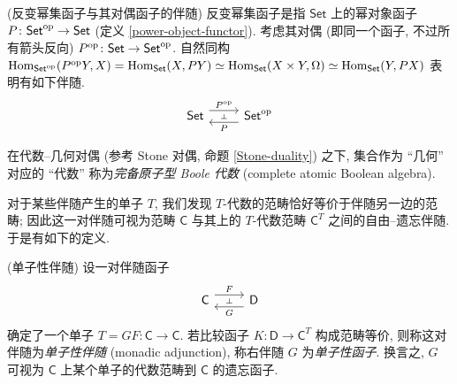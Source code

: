 \begin{example}
	{(反变幂集函子与其对偶函子的伴随)}
	反变幂集函子是指 $\mathsf {Set}$ 上的幂对象函子 $P\colon \mathsf {Set}^{\text{op}} \to \mathsf {Set}$ (定义 \ref{power-object-functor}). 考虑其对偶 (即同一个函子, 不过所有箭头反向) $P^{\text{op}}\colon \mathsf {Set}\to\mathsf {Set}^{\text{op}}$. 自然同构 $\operatorname{Hom}_{\mathsf {Set}^{\text{op}}}(P^{\text{op}} Y,X) = \operatorname{Hom}_{\mathsf {Set}}(X,PY)\simeq \operatorname{Hom}_{\mathsf {Set}}(X\times Y,\Omega) \simeq \operatorname{Hom}_{\mathsf {Set}}(Y,PX)$ 表明有如下伴随.
	\[\begin{tikzcd}[ampersand replacement=\&]
		{\mathsf {Set}} \& {\mathsf {Set}^\op}
		\arrow[""{name=0, anchor=center, inner sep=0}, "{P^\op}", shift left=2, from=1-1, to=1-2]
		\arrow[""{name=1, anchor=center, inner sep=0}, "P", shift left=2, from=1-2, to=1-1]
		\arrow["\dashv"{anchor=center, rotate=-90}, draw=none, from=0, to=1]
	\end{tikzcd}\]
	
	在代数--几何对偶 (参考 Stone 对偶, 命题 \ref{Stone-duality}) 之下, 集合作为 ``几何'' 对应的 ``代数'' 称为\emph{完备原子型 Boole 代数} (complete atomic Boolean algebra).
\end{example}

对于某些伴随产生的单子 $T$, 我们发现 $T$-代数的范畴恰好等价于伴随另一边的范畴; 因此这一对伴随可视为范畴 $\mathsf C$ 与其上的 $T$-代数范畴 $\mathsf C^T$ 之间的自由--遗忘伴随. 于是有如下的定义.

\begin{definition}
    {(单子性伴随)}
    设一对伴随函子
    $$
    \begin{tikzcd}[ampersand replacement=\&]
    	{\mathsf C} \& {\mathsf D}
    	\arrow[""{name=0, anchor=center, inner sep=0}, "G", shift left=2, from=1-2, to=1-1]
    	\arrow[""{name=1, anchor=center, inner sep=0}, "F", shift left=2, from=1-1, to=1-2]
    	\arrow["\dashv"{anchor=center, rotate=-90}, draw=none, from=1, to=0]
    \end{tikzcd}
    $$
    确定了一个单子 $T = GF \colon \mathsf C \to \mathsf C$.
    若比较函子 $K\colon \mathsf D\to\mathsf C^T$ 构成范畴等价, 则称这对伴随为\emph{单子性伴随} (monadic adjunction), 称右伴随 $G$ 为\emph{单子性函子}. 换言之, $G$ 可视为 $\mathsf C$ 上某个单子的代数范畴到 $\mathsf C$ 的遗忘函子.
\end{definition}

